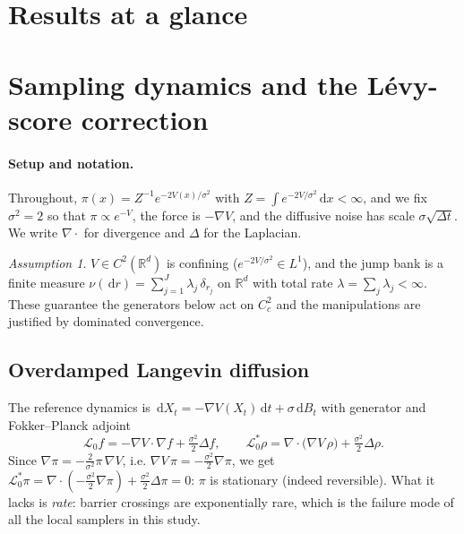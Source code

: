 \documentclass[11pt]{article}
\theoremstyle{plain}
\theoremstyle{remark}
\newtheorem{assumption}{Assumption}
\newcommand{\R}{\mathbb{R}}
\newcommand{\dd}{\,\mathrm{d}}
\begin{document}
\section{Results at a glance}\label{sec:glance}


\section{Sampling dynamics and the L\'evy-score correction}\label{sec:method}

\paragraph{Setup and notation.} Throughout, $\pi(x)=Z^{-1}e^{-2V(x)/\sigma^2}$ with
$Z=\int e^{-2V/\sigma^2}\dd x<\infty$, and we fix $\sigma^2=2$ so that
$\pi\propto e^{-V}$, the force is $-\nabla V$, and the diffusive noise has scale
$\sigma\sqrt{\Delta t}$. We write $\nabla\cdot$ for divergence and $\Delta$ for the
Laplacian.

\begin{assumption}\label{ass:reg}
$V\in C^2(\R^d)$ is confining ($e^{-2V/\sigma^2}\in L^1$), and the jump bank is a
finite measure $\nu(\dd r)=\sum_{j=1}^J\lambda_j\,\delta_{r_j}$ on $\R^d$ with total
rate $\lambda=\sum_j\lambda_j<\infty$. These guarantee the generators below act on
$C_c^2$ and the manipulations are justified by dominated convergence.
\end{assumption}

\subsection{Overdamped Langevin diffusion}
The reference dynamics is $\dd X_t=-\nabla V(X_t)\dd t+\sigma\dd B_t$ with
generator and Fokker--Planck adjoint
\[
\mathcal L_0 f=-\nabla V\!\cdot\!\nabla f+\tfrac{\sigma^2}{2}\Delta f,
\qquad
\mathcal L_0^{*}\rho=\nabla\!\cdot\!\big(\nabla V\,\rho\big)+\tfrac{\sigma^2}{2}\Delta\rho .
\]
Since $\nabla\pi=-\tfrac{2}{\sigma^2}\pi\,\nabla V$, i.e.
$\nabla V\,\pi=-\tfrac{\sigma^2}{2}\nabla\pi$, we get
$\mathcal L_0^{*}\pi=\nabla\!\cdot\!(-\tfrac{\sigma^2}{2}\nabla\pi)+\tfrac{\sigma^2}{2}\Delta\pi=0$:
$\pi$ is stationary (indeed reversible). What it lacks is \emph{rate}: barrier
crossings are exponentially rare, which is the failure mode of all the local
samplers in this study.
\end{document}
